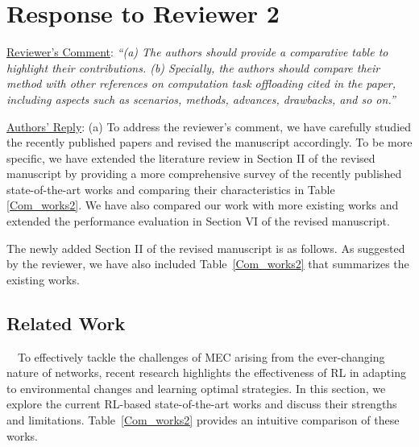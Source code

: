 \documentclass[12pt,draftclsnofoot,onecolumn]{IEEEtran}
\newcommand{\rev}[1]{{\color{blue}#1}} %
\newcommand{\rev}[1]{#1}
\newenvironment{my}[2]%
{\begin{list}{}%
{\setlength{\rightmargin}{#1}\setlength{\leftmargin}{#2}}%


 \item[]{}

} {\end{list}}
\begin{document}
\section{Response to Reviewer 2}
\begin{enumerate}
	
	\item \underline{Reviewer's Comment}: 
	\textit{``(a) The authors should provide a comparative table to highlight their contributions. (b) Specially, the authors should compare their method with other references on computation task offloading cited in the paper, including aspects such as scenarios, methods, advances, drawbacks, and so on.''} \newline

	\underline{Authors' Reply}: (a) To address the reviewer's comment, we have carefully studied the recently published papers and revised the manuscript accordingly. 
	To be more specific, we have extended the literature review in Section II of the revised manuscript by providing a more comprehensive survey of the recently published state-of-the-art works and comparing their characteristics in Table \ref{Com_works2}.
	We have also compared our work with more existing works and extended the performance evaluation in Section VI of the revised manuscript. 


\vspace{3mm}
 The newly added Section II of the revised manuscript is as follows. As suggested by the reviewer, we have also included Table~\ref{Com_works2} that summarizes the existing works.
	
\begin{my}{1cm}{1cm}
	\rev{\setcounter{section}{1}
		\section{Related Work}
		\label{section:RW2}
		
		
		
		\,\,\,\,
		To effectively tackle the challenges of MEC arising from the ever-changing nature of networks, recent research highlights the effectiveness of RL in adapting to environmental changes and learning optimal strategies. In this section, we explore the current RL-based state-of-the-art works and discuss their strengths and limitations. Table~\ref{Com_works2} provides an intuitive comparison of these works. \vspace{2mm}
		
}
\end{my}
\end{enumerate}
\end{document}

